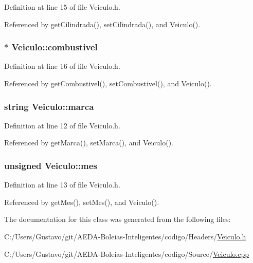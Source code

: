 Definition at line 15 of file Veiculo.\+h.



Referenced by get\+Cilindrada(), set\+Cilindrada(), and Veiculo().

\hypertarget{class_veiculo_ad8416cc9da449baed5e07ed146572712}{
\subsubsection[{combustivel}]{$\ast$ Veiculo\+::combustivel\hspace{0.3cm}{\ttfamily [private]}}}\label{class_veiculo_ad8416cc9da449baed5e07ed146572712}


Definition at line 16 of file Veiculo.\+h.



Referenced by get\+Combustivel(), set\+Combustivel(), and Veiculo().

\hypertarget{class_veiculo_ab20b89442a0ddaedd074bb0de75838c8}{
\subsubsection[{marca}]{\setlength{\rightskip}{0pt plus 5cm}string Veiculo\+::marca\hspace{0.3cm}{\ttfamily [private]}}}\label{class_veiculo_ab20b89442a0ddaedd074bb0de75838c8}


Definition at line 12 of file Veiculo.\+h.



Referenced by get\+Marca(), set\+Marca(), and Veiculo().

\hypertarget{class_veiculo_ac4146f7b3d38e31e3225074e0fb0dea9}{
\subsubsection[{mes}]{\setlength{\rightskip}{0pt plus 5cm}unsigned Veiculo\+::mes\hspace{0.3cm}{\ttfamily [private]}}}\label{class_veiculo_ac4146f7b3d38e31e3225074e0fb0dea9}


Definition at line 13 of file Veiculo.\+h.



Referenced by get\+Mes(), set\+Mes(), and Veiculo().



The documentation for this class was generated from the following files\+:\begin{DoxyCompactItemize}
\item 
C\+:/\+Users/\+Gustavo/git/\+A\+E\+D\+A-\/\+Boleias-\/\+Inteligentes/codigo/\+Headers/\hyperlink{_veiculo_8h}{Veiculo.\+h}\item 
C\+:/\+Users/\+Gustavo/git/\+A\+E\+D\+A-\/\+Boleias-\/\+Inteligentes/codigo/\+Source/\hyperlink{_veiculo_8cpp}{Veiculo.\+cpp}\end{DoxyCompactItemize}
